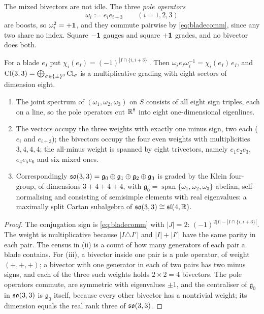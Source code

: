 The mixed bivectors are not idle. The three \emph{pole operators}
\[
\omega_i:=e_ie_{i+3}\qquad(i=1,2,3)
\]
are boosts, so $\omega_i^2=+\mathbf 1$, and they commute pairwise by \eqref{eq:bladecomm}, since any two share no index. Square
$-\mathbf 1$ gauges and square $+\mathbf 1$ grades, and no bivector does both.

\begin{proposition}[A $\Z_2^3$ grading of $\Cl(3,3)$]
\label{prop:grading}
For a blade $e_I$ put $\chi_i(e_I)=(-1)^{|I\cap\{i,i+3\}|}$. Then $\omega_ie_I\omega_i^{-1}=\chi_i(e_I)\,e_I$, and
$\mathrm{Cl}(3,3)=\bigoplus_{\sigma\in\{\pm\}^3}\mathrm{Cl}_\sigma$ is a multiplicative grading with eight sectors of dimension eight.
\begin{enumerate}[label=(\roman*),leftmargin=2.2em]
\item The joint spectrum of $(\omega_1,\omega_2,\omega_3)$ on $S$ consists of all eight sign triples, each on a line, so the
pole operators cut $\mathbb{R}^8$ into eight one-dimensional eigenlines.
\item The vectors occupy the three weights with exactly one minus sign, two each ($e_i$ and $e_{i+3}$); the bivectors occupy
the four even weights with multiplicities $3,4,4,4$; the all-minus weight is spanned by eight trivectors, namely $e_1e_2e_3$,
$e_4e_5e_6$ and six mixed ones.
\item Correspondingly $\mathfrak{so}(3,3)=\mathfrak g_0\oplus\mathfrak g_1\oplus\mathfrak g_2\oplus\mathfrak g_3$ is graded by the Klein
four-group, of dimensions $3+4+4+4$, with $\mathfrak g_0=\operatorname{span}\{\omega_1,\omega_2,\omega_3\}$ abelian,
self-normalising and consisting of semisimple elements with real eigenvalues: a maximally split Cartan subalgebra of
$\mathfrak{so}(3,3)\cong\mathfrak{sl}(4,\mathbb{R})$.
\end{enumerate}
\end{proposition}

\begin{proof}
The conjugation sign is \eqref{eq:bladecomm} with $|J|=2$: $(-1)^{2|I|-|I\cap\{i,i+3\}|}$. The weight is multiplicative because
$|I\triangle I'|$ and $|I|+|I'|$ have the same parity in each pair. The census in (ii) is a count of how many generators of
each pair a blade contains. For (iii), a bivector inside one pair is a pole operator, of weight $(+,+,+)$; a bivector with one
generator in each of two pairs has two minus signs, and each of the three such weights holds $2\times2=4$ bivectors. The
pole operators commute, are symmetric with eigenvalues $\pm1$, and the centraliser of $\mathfrak g_0$ in $\mathfrak{so}(3,3)$ is
$\mathfrak g_0$ itself, because every other bivector has a nontrivial weight; its dimension equals the real rank three of
$\mathfrak{so}(3,3)$.
\end{proof}

